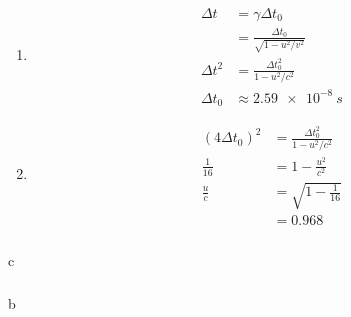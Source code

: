 \documentclass{article}
\begin{document}
\setcounter{subsubsection}{64}
\subsubsection{}

\begin{enumerate}
  \item

        \begin{align*}
          \Delta t   & = \gamma \Delta t_0                       \\
                     & = \frac{\Delta t_0}{\sqrt{1 - u^2 / v^2}} \\
          \Delta t^2 & = \frac{\Delta t_0^2}{1 - u^2 / c^2}      \\
          \Delta t_0 & \approx \qty{2.59e-8}{s}
        \end{align*}

  \item

        \begin{align*}
          (4 \Delta t_0)^2 & = \frac{\Delta t_0^2}{1 - u^2 / c^2} \\
          \frac{1}{16}     & = 1 - \frac{u^2}{c^2}                \\
          \frac{u}{c}      & = \sqrt{1 - \frac{1}{16}}            \\
                           & = 0.968
        \end{align*}
\end{enumerate}

\setcounter{subsubsection}{70}
\subsubsection{}

c

\setcounter{subsubsection}{72}
\subsubsection{}

b
\end{document}
